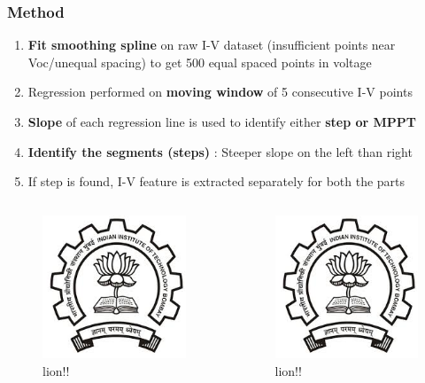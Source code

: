 \documentclass{beamer}
\begin{document}
	\begin{frame}[t]
		\frametitle{Method}
		\begin{enumerate}
			\item \textbf{Fit smoothing spline} on raw I-V dataset (insufficient points near Voc/unequal spacing) to get 500 equal spaced points in voltage
			\item Regression performed on \textbf{moving window} of 5 consecutive I-V points
			\item \textbf{Slope} of each regression line is used to identify either \textbf{step or MPPT}
			\item \textbf{Identify the segments (steps)} : Steeper slope on the left than right
			\item If step is found, I-V feature is extracted separately for both the parts
		\end{enumerate}
	\begin{columns}
			\begin{figure}
				\includegraphics[scale=0.35]{logo}
				\caption{lion!!}
			\end{figure}
			\begin{figure}
				\includegraphics[scale=0.35]{logo}
				\caption{lion!!}
			\end{figure}
	\end{columns}
	\end{frame}
\end{document}
